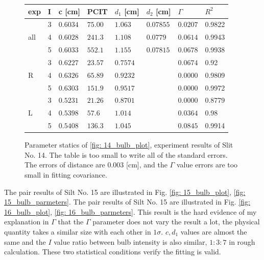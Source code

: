\documentclass{article}
\begin{document}
\begin{figure}[H]
    \begin{tabular}{  m{0.6cm}|m{0.3cm}|m{1.7cm}|m{1.7cm}|m{2cm}|m{2cm}|m{2cm}|m{1cm} } 
        exp & I & c [cm]& PCIT & $d_1$ [cm] & $d_2$ [cm] & $\Gamma$ & $R^2$ \\ \hline \hline
        \multirow{3}{*}{all}& 3 & $0.6034 $ & $75.00$& $1.063$& $0.07855$& $0.0207$& 0.9822\\ \cline{2-8}
                            & 4 & $0.6028$& $241.3$& $1.108$& $0.0779$& $0.0614$& 0.9943\\ \cline{2-8} 
                            & 5 & $0.6033$& $552.1$& $1.155$& $0.07815$& $0.0678 $& 0.9938\\ \hline 
        \multirow{3}{*}{R}  & 3 & $0.6227 $& $23.57$& $0.7574$&& $0.0674 $& 0.92\\ \cline{2-8}
                            & 4 &$0.6326$& $65.89$& $0.9232$&& $0.0000 $& 0.9809\\ \cline{2-8}
                            & 5 &$0.6303$& $151.9$& $0.9517$&& $0.0000$& 0.9972\\ \hline
        \multirow{3}{*}{L}  & 3 & $0.5231$& $21.26$& $0.8701$&& $0.0000$& 0.8779\\ \cline{2-8}
                            & 4 & $0.5398$& $57.6$& $1.014 $&& $0.0364 $& 0.98\\ \cline{2-8}
                            & 5 & $0.5408$& $136.3$& $1.045 $&& $0.0845$& 0.9914\\ \hline
    \end{tabular}
    \caption{Parameter statics of \ref{fig: 14_bulb_plot}, experiment results of Slit No. 14.
     The table is too small to write all of the standard errors.
     The errors of distance are $0.003$ [cm], and the $\Gamma$ value errors are too small in fitting covariance.
    }
    \label{fig: 14_bulb_parmeters}

\end{figure}


The pair results of Silt No. 15 are illustrated in Fig. \ref{fig: 15_bulb_plot}, \ref{fig: 15_bulb_parmeters}.
The pair results of Silt No. 15 are illustrated in Fig. \ref{fig: 16_bulb_plot}, \ref{fig: 16_bulb_parmeters}.
This result is the hard evidence of my explanation in $\Gamma$ that the $\Gamma$ parameter does not vary the result a lot, the physical quantity takes a similar size with each other in $1 \sigma$.
$c, d_1$ values are almost the same and the $I$ value ratio between bulb intensity is also similar, $1:3:7$ in rough calculation.
These two statistical conditions verify the fitting is valid.
\end{document}
